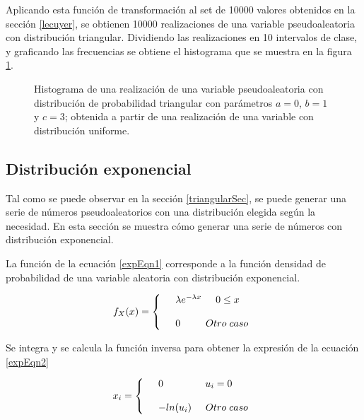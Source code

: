 \documentclass{sig-alternate}
\begin{document}
Aplicando esta funci\'on de transformaci\'on al set de 10000 valores obtenidos en la secci\'on \ref{lecuyer}, se obtienen 10000 realizaciones de una variable pseudoaleatoria con distribuci\'on triangular. Dividiendo las realizaciones en 10 intervalos de clase, y graficando las frecuencias se obtiene el histograma que se muestra en la figura \ref{histogramaTriang}.

\begin{figure}[t]
\centering
\caption{Histograma de una realizaci\'on de una variable pseudoaleatoria con distribuci\'on de probabilidad triangular con par\'ametros $a=0$, $b=1$ y $c=3$; obtenida a partir de una realizaci\'on de una variable con distribuci\'on uniforme.}
\label{histogramaTriang}
\end{figure}

\subsection{Distribuci\'on exponencial}
\label{exponencialSec}

Tal como se puede observar en la secci\'on \ref{triangularSec}, se puede generar una serie de n\'umeros pseudoaleatorios con una distribuci\'on elegida seg\'un la necesidad. En esta secci\'on se muestra c\'omo generar una serie de n\'umeros con distribuci\'on exponencial.

La funci\'on de la ecuaci\'on \ref{expEqn1} corresponde a la funci\'on densidad de probabilidad de una variable aleatoria con distribuci\'on exponencial.

\begin{align}
\label{expEqn1}
  f_{X}(x) = \left\{
  \begin{array}{rl}
	&\lambda e^{-\lambda x} \hspace{0.5cm} 0 \le x\\\\
	&0 \hspace{0.9 cm} Otro \hspace{0.1cm} caso
  \end{array} \right.
\end{align}

Se integra y se calcula la funci\'on inversa para obtener la expresi\'on de la ecuaci\'on \ref{expEqn2}

\begin{align}
\label{expEqn2}
 x_i = \left\{
  \begin{array}{rl}
	&0 \hspace{1.5 cm} u_i = 0\\\\
	&-ln(u_i) \hspace{0.5cm} Otro \hspace{0.1cm} caso
  \end{array} \right.
\end{align}
\end{document}
